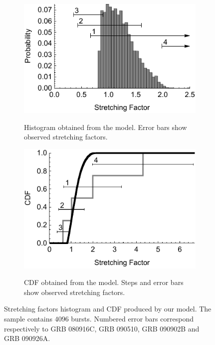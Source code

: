 \documentclass[11pt,a4paper]{article}
\begin{document}
\begin{figure}
	\hspace*{\fill}
	\begin{subfigure}{0.45\textwidth}
		\includegraphics[width=\textwidth]{kappaDistributionHistogram}
		\label{fig:kappaDistributionHistogram}
		\caption{Histogram obtained from the model. Error bars show observed stretching factors.}
	\end{subfigure}
	\hfill
	\begin{subfigure}{0.45\textwidth}
		\includegraphics[width=\textwidth]{kappaDistributionCDF}
		\label{fig:kappaDistributionCDF}
		\caption{CDF obtained from the model. Steps and error bars show observed stretching factors.}
	\end{subfigure}
	\hspace*{\fill}
	\caption{
		Stretching factors histogram and CDF produced by our model.
		The sample contains $4096$ bursts.
		Numbered error bars correspond respectively to GRB 080916C, GRB 090510, GRB 090902B and GRB 090926A.
	}
	\label{fig:kappaDistribution}
\end{figure}
\end{document}
